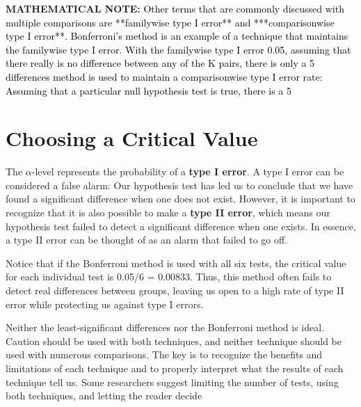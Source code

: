 \documentclass[
]{report}
\theoremstyle{definition}
\theoremstyle{definition}
\theoremstyle{definition}
\theoremstyle{definition}
\theoremstyle{remark}
\begin{document}
\large

\textbf{MATHEMATICAL NOTE:}
\textcolor{black}{Other terms that are commonly discussed with multiple comparisons are **familywise type I error** and
***comparisonwise type I error**. Bonferroni’s method is an example of a technique that maintains the familywise type I error. With the familywise type I error 0.05, assuming that there really is no difference between any of the K pairs, there is only a 5%
differences method is used to maintain a comparisonwise type I error rate: Assuming that a particular null hypothesis test is true, there is a 5%
}

\normalsize

\hypertarget{choosing-a-critical-value}{%
\section*{\texorpdfstring{\textbf{Choosing a Critical Value}}{Choosing a Critical Value}}\label{choosing-a-critical-value}}

The \(\alpha\)-level represents the probability of a \textbf{type I error}. A type I error can be considered a false alarm: Our hypothesis test has led us to conclude that we have found a significant difference when one does not exist. However, it is important to recognize that it is also possible to make a \textbf{type II error}, which means our hypothesis
test failed to detect a significant difference when one exists. In essence, a type II error can be thought of as an alarm that failed to go off.

Notice that if the Bonferroni method is used with all six tests, the critical value for each individual test is 0.05/6 = 0.00833. Thus, this method often fails to detect real differences between groups, leaving us open to a high rate of type II error while protecting us against type I errors.

Neither the least-significant differences nor the Bonferroni method is ideal. Caution should be used with both techniques, and neither technique should be used with numerous comparisons. The key is to recognize the benefits and limitations of each technique and to properly interpret what the results of each technique tell us. Some researchers suggest limiting the number of tests, using both techniques, and letting the reader decide
\end{document}
